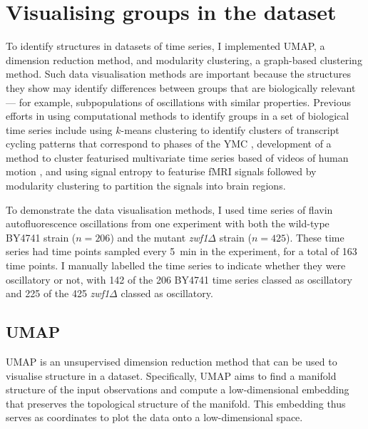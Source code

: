 \section{Visualising groups in the dataset}
\label{sec:analysis-clustering}

To identify structures in datasets of time series, I implemented UMAP, a dimension reduction method, and modularity clustering, a graph-based clustering method.
Such data visualisation methods are important because the structures they show may identify differences between groups that are biologically relevant --- for example, subpopulations of oscillations with similar properties.
Previous efforts in using computational methods to identify groups in a set of biological time series include using $k$-means clustering to identify clusters of transcript cycling patterns that correspond to phases of the YMC \parencite{tuLogicYeastMetabolic2005}, development of a method to cluster featurised multivariate time series based of videos of human motion \parencite{wangStructureBasedStatisticalFeatures2007}, and using signal entropy to featurise fMRI signals followed by modularity clustering to partition the signals into brain regions.

To demonstrate the data visualisation methods, I used time series of flavin autofluorescence oscillations from one experiment with both the wild-type BY4741 strain ($n=206$) and the mutant \textit{zwf1$\Delta$} strain ($n=425$).
These time series had time points sampled every \SI{5}{\minute} in the experiment, for a total of 163 time points.
I manually labelled the time series to indicate whether they were oscillatory or not, with 142 of the 206 BY4741 time series classed as oscillatory and 225 of the 425 \textit{zwf1$\Delta$} classed as oscillatory.


\subsection{UMAP}
\label{subsec:analysis-clustering-umap}

UMAP \parencite{mcinnesUMAPUniformManifold2020} is an unsupervised dimension reduction method that can be used to visualise structure in a dataset.
Specifically, UMAP aims to find a manifold structure of the input observations and compute a low-dimensional embedding that preserves the topological structure of the manifold.
This embedding thus serves as coordinates to plot the data onto a low-dimensional space.

